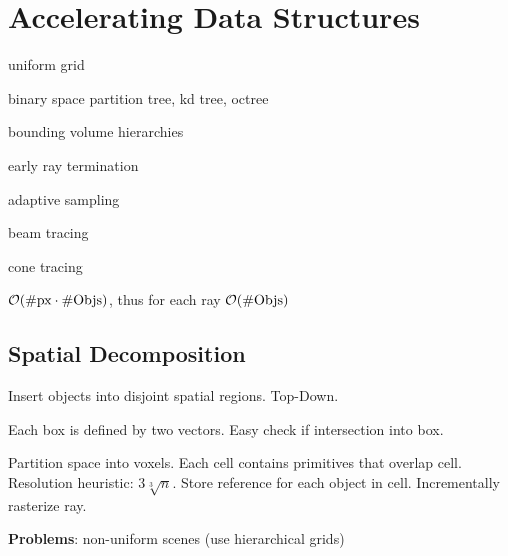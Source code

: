 \section{Accelerating Data Structures}

\begin{definition}
  \begin{itemize*}
    \item uniform grid
    \item binary space partition tree, kd tree, octree
    \item bounding volume hierarchies
  \end{itemize*}
\end{definition}

\begin{definition}
  \begin{itemize*}
    \item early ray termination
    \item adaptive sampling
  \end{itemize*}
\end{definition}

\begin{definition}
  \begin{itemize*}
    \item beam tracing
    \item cone tracing
  \end{itemize*}
\end{definition}

\begin{definition}
  \(\mathcal{O}(\#\text{px} \cdot \#\text{Objs})\), thus for each ray \(\mathcal{O}(\#\text{Objs})\)
\end{definition}

\subsection{Spatial Decomposition}
Insert objects into disjoint spatial regions. Top-Down.

\begin{definition}
  Each box is defined by two vectors. Easy check if intersection into box.
\end{definition}

\begin{definition}
  Partition space into voxels.
  Each cell contains primitives that overlap cell.
  Resolution heuristic: \(3 \sqrt[3]{n}\).
  Store reference for each object in cell.
  Incrementally rasterize ray.

  \textbf{Problems}: non-uniform scenes (use hierarchical grids)
\end{definition}

